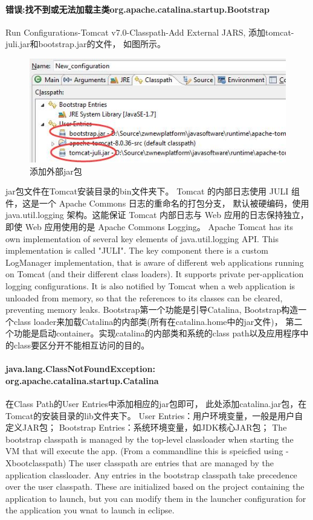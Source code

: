 \documentclass{book}
\begin{document}
\paragraph{错误:找不到或无法加载主类org.apache.catalina.startup.Bootstrap}

Run Configurations-Tomcat v7.0-Classpath-Add External JARS,
添加tomcat-juli.jar和bootstrap.jar的文件，
如图所示。

\begin{figure}[htbp]
	\centering
	\includegraphics[scale=0.5]{DebugTomcatAddMissingJar.jpg}
	\caption{添加外部jar包}
	\label{code:DebugTomcatAddMissingJar}
\end{figure}

jar包文件在Tomcat安装目录的bin文件夹下。
Tomcat 的内部日志使用 JULI 组件，这是一个 Apache Commons 日志的重命名的打包分支，
默认被硬编码，使用 java.util.logging 架构。这能保证 Tomcat 内部日志与 Web 应用的日志保持独立，
即使 Web 应用使用的是 Apache Commons Logging。
Apache Tomcat has its own implementation of several key elements of java.util.logging API. 
This implementation is called "JULI". The key component there is a custom LogManager implementation, 
that is aware of different web applications running on Tomcat (and their different class loaders). 
It supports private per-application logging configurations. 
It is also notified by Tomcat when a web application is unloaded from memory, 
so that the references to its classes can be cleared, preventing memory leaks.
Bootstrap第一个功能是引导Catalina,
Bootstrap构造一个class loader来加载Catalina的内部类(所有在catalina.home中的jar文件)，
第二个功能是启动container。实现catalina的内部类和系统的class path以及应用程序中的class要区分开不能相互访问的目的。　

\paragraph{java.lang.ClassNotFoundException: org.apache.catalina.startup.Catalina}

在Class Path的User Entries中添加相应的jar包即可，
此处添加catalina.jar包，在Tomcat的安装目录的lib文件夹下。
User Entries：用户环境变量，一般是用户自定义JAR包；
Bootstrap Entries：系统环境变量，如JDK核心JAR包；
The bootstrap classpath is managed by the top-level 
classloader when starting the VM that will execute the app. 
(From a commandline this is speicfied using -Xbootclasspath)
The user classpath are entries that are managed by the application classloader.
Any entries in the bootstrap classpath take precedence over the user classpath.
These are initialized based on the project containing the application to launch, 
but you can modify them in the launcher configuration for the application you wnat to launch in eclipse.
\end{document}
